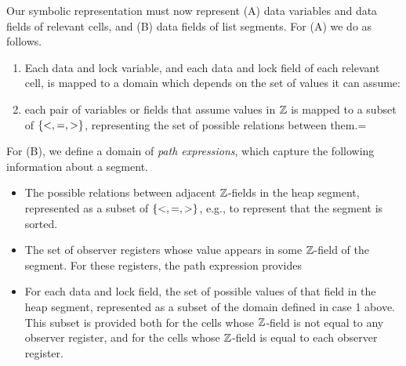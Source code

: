 Our symbolic representation must now represent
(A) data variables and data fields of relevant cells, and
(B) data fields of list segments.
For (A) we do as follows.
\begin{enumerate}
\item
Each  data and lock variable, and each data and lock field of each relevant cell,
  is mapped to a domain which depends on the set of values it can assume:
\item each pair of variables or fields that assume values in ${\mathbb Z}$
  is mapped to a subset of ${\left\{<,=,>\right\}}$, representing the
  set of possible relations between them.=
\end{enumerate}
For (B), we define a domain of {\em path expressions}, which
capture the following information about a segment.
\begin{itemize}
\item
  The possible relations between adjacent ${\mathbb Z}$-fields in the heap segment,
  represented as a subset of ${\left\{<,=,>\right\}}$,
e.g., to represent that the segment is sorted.
\item
  The set of observer registers whose value appears in some ${\mathbb Z}$-field
  of the segment. For these
  registers, the path expression provides
\item
For each data and lock field, 
the set of possible values of that field in the heap segment, represented
as a subset of the domain defined in case 1 above.
This subset is provided both
for the cells whose ${\mathbb Z}$-field is not equal to any
observer register, and for the cells whose ${\mathbb Z}$-field is
equal to each observer register.
\end{itemize}
